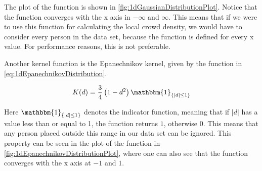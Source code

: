 The plot of the function is shown in \cref{fig:1dGaussianDistributionPlot}. Notice that the function converges with the x axis in $-\infty$ and $\infty$. This means that if we were to use this function for calculating the local crowd density, we would have to consider every person in the data set, because the function is defined for every x value. For performance reasons, this is not preferable.

Another kernel function is the Epanechnikov kernel, given by the function in \cref{eq:1dEpanechnikovDistribution}.

\begin{equation}
\label{eq:1dEpanechnikovDistribution}
K(d) = \frac{3}{4} \left( 1-d^2 \right) \mathbbm{1}_{\{\left| d \right| \leq 1\}}
\end{equation}

Here $\mathbbm{1}_{\{|d| \leq 1\}}$ denotes the indicator function, meaning that if $|d|$ has a value less than or equal to 1, the function returns $1$, otherwise $0$. This means that any person placed outside this range in our data set can be ignored. This property can be seen in the plot of the function in \cref{fig:1dEpanechnikovDistributionPlot}, where one can also see that the function converges with the x axis at $-1$ and $1$.

